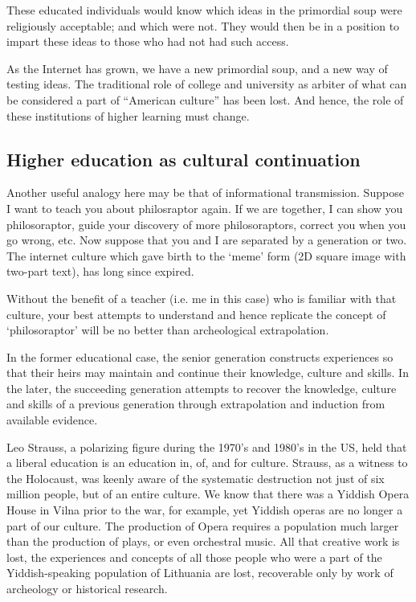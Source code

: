 These educated individuals would know which ideas in the primordial soup were religiously acceptable; and which were not. They would then be in a position to impart these ideas to those who had not had such access.

As the Internet has grown, we have a new primordial soup, and a new way of testing ideas. The traditional role of college and university as arbiter of what can be considered a part of ``American culture'' has been lost. And hence, the role of these institutions of higher learning must change.

\subsection{Higher education as cultural continuation}
\label{highereducationasculturalcontinuation}

Another useful analogy here may be that of informational transmission. Suppose I want to teach you about philosraptor again. If we are together, I can show you philosoraptor, guide your discovery of more philosoraptors, correct you when you go wrong, etc. Now suppose that you and I are separated by a generation or two. The internet culture which gave birth to the `meme' form (2D square image with two-part text), has long since expired.

Without the benefit of a teacher (i.e. me in this case) who is familiar with that culture, your best attempts to understand and hence replicate the concept of `philosoraptor' will be no better than archeological extrapolation.

In the former educational case, the senior generation constructs experiences so that their heirs may maintain and continue their knowledge, culture and skills. In the later, the succeeding generation attempts to recover the knowledge, culture and skills of a previous generation through extrapolation and induction from available evidence.

Leo Strauss, a polarizing figure during the 1970's and 1980's in the US, held that a liberal education is an education in, of, and for culture. Strauss, as a witness to the Holocaust, was keenly aware of the systematic destruction not just of six million people, but of an entire culture. We know that there was a Yiddish Opera House in Vilna prior to the war, for example, yet Yiddish operas are no longer a part of our culture. The production of Opera requires a population much larger than the production of plays, or even orchestral music. All that creative work is lost, the experiences and concepts of all those people who were a part of the Yiddish-speaking population of Lithuania are lost, recoverable only by work of archeology or historical research.

